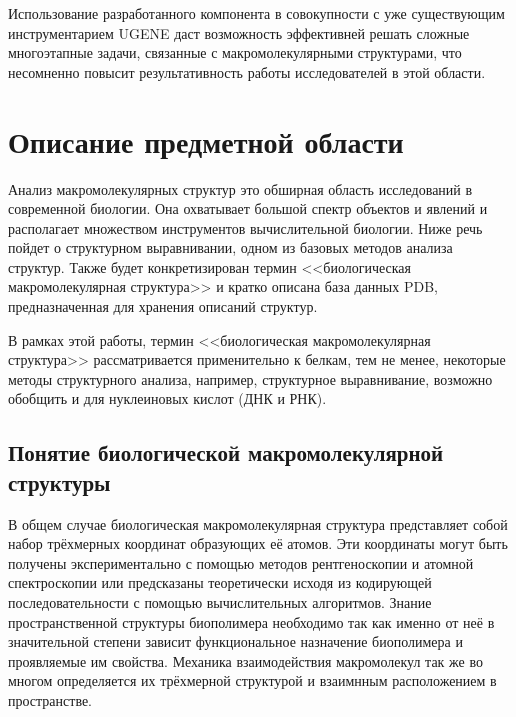 \documentclass[a4paper, 12pt, titlepage, utf8]{extarticle}
\let\oldsection\section         %
\renewcommand{\section}{\newpage\oldsection}
\newenvironment{myfigure}[2]%
{\pushQED{\caption{#1} \label{#2}} %
    \begin{figure}[!htb]\centering } %
{  \popQED %
    \end{figure}}
\newcommand{\includefigure}[3][]{
\begin{myfigure}{#2}{fig:#3}
    \texttt{[image: \#3]}
\end{myfigure}
}
\begin{document}
Использование разработанного компонента в совокупности с уже существующим инструментарием UGENE даст возможность эффективней решать сложные многоэтапные задачи, связанные с макромолекулярными структурами, что несомненно повысит результативность работы исследователей в этой области.


\section{Описание предметной области}	%
Анализ макромолекулярных структур это обширная область исследований в современной биологии. Она охватывает большой спектр объектов и явлений и располагает множеством инструментов вычислительной биологии. Ниже речь пойдет о структурном выравнивании, одном из базовых методов анализа структур. Также будет конкретизирован термин <<биологическая макромолекулярная структура>> и кратко описана база данных PDB, предназначенная для хранения описаний структур.

В рамках этой работы, термин <<биологическая макромолекулярная структура>> рассматривается применительно к белкам, тем не менее, некоторые методы структурного анализа, например, структурное выравнивание, возможно обобщить и для нуклеиновых кислот (ДНК и РНК).

\subsection{Понятие биологической макромолекулярной структуры}
В общем случае биологическая макромолекулярная структура представляет собой набор трёхмерных координат образующих её атомов. Эти координаты могут быть получены экспериментально с помощью методов рентгеноскопии и атомной спектроскопии или предсказаны теоретически исходя из кодирующей последовательности с помощью вычислительных алгоритмов. Знание пространственной структуры биополимера необходимо так как именно от неё в значительной степени зависит функциональное назначение биополимера и проявляемые им свойства. Механика взаимодействия макромолекул так же во многом определяется их трёхмерной структурой и взаимнным расположением в пространстве. 

\end{document}
